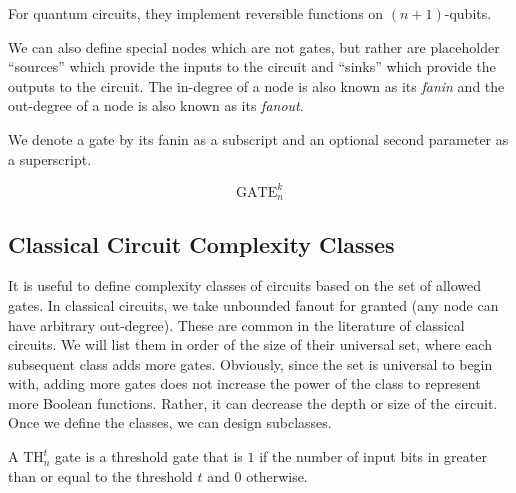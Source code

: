 For quantum circuits, they implement reversible functions on
$(n+1)$-qubits.


 We can also define special nodes which are not gates, but rather
are placeholder ``sources'' which provide the inputs to the circuit and 
``sinks'' which provide the outputs to the circuit. The in-degree of a 
node is also known as its \emph{fanin} and the out-degree of a node is
also known as its \emph{fanout}.

We denote a gate by its fanin as a subscript and an optional
second parameter as a superscript.

\begin{equation}
\text{GATE}_n^k
\end{equation}

\subsection{Classical Circuit Complexity Classes}

It is useful to define complexity classes of circuits based on the
set of allowed gates. In classical circuits, we take unbounded fanout
for granted (any node can have arbitrary out-degree). These are common
in the literature of classical circuits. We will list them in order
of the size of their universal set, where each subsequent class adds
more gates.
Obviously, since the set is universal to begin with, adding more gates
does not increase the power of the class to represent more Boolean
functions. Rather, it can decrease the depth or size of the circuit.
Once we define the classes, we can design subclasses.

\begin{definition}
\item[\textsf{NC}]
circuits consisting of $\text{NOT}_1$ and $\text{AND}_2$ and
$\text{OR}_2}$ gates.
\item[\textsf{AC}]
NC circuits augmented with $\text{AND}_n$ and $\text{OR}_n$ gates,
for $n \ge 2$.
\item[\textsf{TC}]
AC circuits augmented with $\text{TH}_n^t$ gates, for $n \ge 2$ and
$0 \le t \le n$.
\end{definition}

A $\text{TH}^t_n$ gate is a threshold gate that is $1$ if the number
of input bits in greater than or equal to the threshold $t$ and $0$
otherwise.

\begin{equation}
\end{equation}

